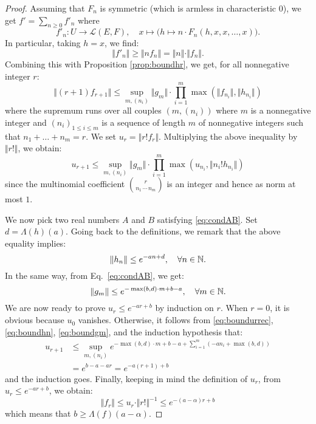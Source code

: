\documentclass{sig-alternate}
\begin{document}
\begin{proof}
Assuming that $F_n$ is symmetric (which is armless in characteristic 
$0$), we get $f' = \sum_{n \geq 0} f'_n$ where
$$f'_n : U \to \mathcal L(E,F), \quad
x \mapsto \big(h \mapsto n \cdot F_n(h, x, x, \ldots, x)\big).$$
In particular, taking $h = x$, we find:
\begin{equation}
\label{eq:normderivative}
\Vert f'_n \Vert \geq \Vert n f_n \Vert = 
\Vert n \Vert \cdot \Vert f_n \Vert.
\end{equation}
Combining this with Proposition \ref{prop:boundhr}, we get, for all
nonnegative integer $r$:
$$\Vert (r+1) f_{r+1} \Vert \leq
  \sup_{m, (n_i)} \Vert g_m \Vert \cdot 
  \prod_{i=1}^m \max(\Vert f_{n_i} \Vert, \Vert h_{n_i} \Vert)$$
where the supremum runs over all couples $(m, (n_i))$ where $m$
is a nonnegative integer and $(n_i)_{1 \leq i \leq m}$ is a sequence of
length $m$ of nonnegative integers such that $n_1 + \ldots + n_m = r$.
We set $u_r = \Vert r! f_r \Vert$. Multiplying the above inequality by
$\Vert r! \Vert$, we obtain:
\begin{equation}
\label{eq:boundurrec}
u_{r+1} \leq
  \sup_{m, (n_i)} \Vert g_m \Vert \cdot 
  \prod_{i=1}^m \max(u_{n_i}, \Vert n_i! h_{n_i} \Vert)
\end{equation}
since the multinomial coefficient $\binom r {\!n_1 \, \cdots \, n_m\!}$
is an integer and hence as norm at most $1$.

We now pick two real numbers $A$ and $B$ satisfying \eqref{eq:condAB}.
Set $d = \Lambda(h)(a)$. Going back to the definitions, we remark that
the above equality implies:
\begin{equation}
\label{eq:boundhn}
\Vert h_n \Vert \leq e^{- a n + d},
  \quad \forall n \in \mathbb N.
\end{equation}
In the same way, from Eq.~\eqref{eq:condAB}, we get:
\begin{equation}
\label{eq:boundgm}
\Vert g_m \Vert \leq e^{- \max(b,d)\cdot m + b - a},
  \quad \forall m \in \mathbb N.
\end{equation}
We are now ready to prove $u_r \leq e^{-ar + b}$ by induction on $r$.
When $r = 0$, it is obvious because $u_0$ vanishes. Otherwise, it
follows from \eqref{eq:boundurrec}, \eqref{eq:boundhn}, \eqref{eq:boundgm}, 
and the induction hypothesis that:
\begin{align*}
u_{r+1} 
& \leq \sup_{m, (n_i)}
    e^{ -\max(b,d)\cdot m + b - a + \sum_{i=1}^m (-a n_i + \max(b,d))} \\
& = e^{ b - a - a r } = e^{ -a (r+1) + b}
\end{align*}
and the induction goes.
Finally, keeping in mind the definition of $u_r$, from $u_r \leq 
e^{-a r + b}$, we obtain:
$$\Vert f_r \Vert \leq u_r \cdot \Vert r! \Vert^{-1} \leq
e^{-(a - \alpha) r + b}$$
which means that $b \geq \Lambda(f)(a - \alpha)$.
\end{proof}
\end{document}
